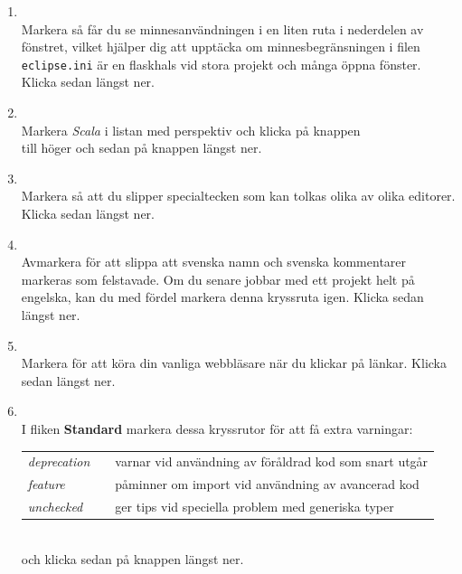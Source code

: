 \begin{enumerate}
\item \EclipsePrefsGeneral 
\\ Markera  så får du se minnesanvändningen i en liten ruta i nederdelen av fönstret, vilket hjälper dig att upptäcka om minnesbegränsningen i filen \texttt{eclipse.ini} är en flaskhals vid stora projekt och många öppna fönster. Klicka sedan  längst ner.

\item \label{item:scala-perspective} \EclipsePrefsGeneral{}  
\\ Markera \textit{Scala} i listan med perspektiv och klicka på knappen 
 \\  till höger och sedan på knappen  längst ner.

\item \EclipsePrefsGeneral{}
\\ Markera  så att du slipper specialtecken som kan tolkas olika av olika editorer. Klicka sedan  längst ner.

\item \EclipsePrefsGeneral{}
\\  Avmarkera  för att slippa att svenska namn och svenska kommentarer markeras som felstavade. Om du senare jobbar med ett projekt helt på engelska, kan du med fördel markera denna kryssruta igen. Klicka sedan  längst ner.

\item \EclipsePrefsGeneral{}
\\ Markera  för att köra din vanliga webbläsare när du klickar på länkar. Klicka sedan  längst ner.
  
\item  \EclipsePrefs{}
\\ I fliken \textbf{Standard} markera dessa kryssrutor för att få extra varningar: \\
\begin{tabular}{l @{}l @{}l}
\textit{deprecation} & \FramedCheckmark{} & varnar vid användning av föråldrad kod som snart utgår \\
\textit{feature}     & \FramedCheckmark{} & påminner om import vid användning av avancerad kod  \\
\textit{unchecked}   & \FramedCheckmark{} & ger tips vid speciella problem med generiska typer \\
\end{tabular}\\
och klicka sedan på knappen  längst ner.


\end{enumerate}
